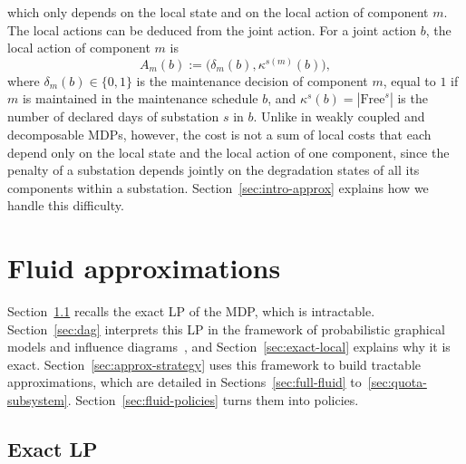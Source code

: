 \documentclass{article}
\begin{document}
which only depends on the local state and on the local action of component $m$. The local actions can be deduced from the
joint action. For a joint action $b$, the local action of component $m$ is
\[
A_m(b) := \big(\delta_m(b), \kappa^{s(m)}(b)\big),
\]
where $\delta_m(b) \in \{0,1\}$ is the maintenance decision of component $m$, equal to $1$ if $m$ is maintained in the
maintenance schedule $b$, and
$\kappa^s(b) = |\text{Free}^s|$ is the number of declared days of substation $s$ in $b$. Unlike in
weakly coupled and decomposable MDPs, however, the cost is not a sum of local costs that each depend only on the local
state and the local action of one component, since the penalty of a substation depends jointly on the degradation
states of all its components within a substation. Section~\ref{sec:intro-approx} explains how we handle this difficulty.


\section{Fluid approximations}
\label{sec:combinatorial}

Section~\ref{sec:fluid-lp} recalls the exact LP of the MDP, which is intractable. Section~\ref{sec:dag} interprets
this LP in the framework of probabilistic graphical models and influence diagrams~\cite{parmentier2019integer}, and
Section~\ref{sec:exact-local} explains why it is exact. Section~\ref{sec:approx-strategy} uses this framework to build
tractable approximations, which are detailed in Sections~\ref{sec:full-fluid} to~\ref{sec:quota-subsystem}.
Section~\ref{sec:fluid-policies} turns them into policies.

\subsection{Exact LP}
\label{sec:fluid-lp}
\end{document}
